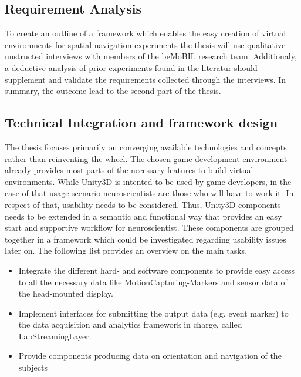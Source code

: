\documentclass[	DIV=calc, paper=a4,	fontsize=11pt, twocolumn]{scrartcl}
\newcommand{\cItemSpacing}{0.05em}
\begin{document}
\subsection*{Requirement Analysis}
To create an outline of a framework which enables the easy creation of virtual environments for spatial navigation experiments the thesis will use qualitative unstructed interviews with members of the beMoBIL research team. Additionaly, a deductive analysis of prior experiments found in the literatur should supplement and validate the requirements collected through the interviews. In summary, the outcome lead to the second part of the thesis.

\subsection*{Technical Integration and framework design} 
The thesis focuses primarily on converging available technologies and concepts rather than reinventing the wheel. The chosen game development environment already provides most parts of the necessary features to build virtual environments. While Unity3D is intented to be used by game developers, in the case of that usage scenario neuroscientists are those who will have to work it. In respect of that, usability needs to be considered. 
Thus, Unity3D components needs to be extended in a semantic and functional way that provides an easy start and supportive workflow for neuroscientist. These components are grouped together in a framework which could be investigated regarding usability issues later on. The following list provides an overview on the main tasks.

\begin{itemize}
\setlength\itemsep{\cItemSpacing}
\item Integrate the different hard- and software components to provide easy access to all the necessary data like MotionCapturing-Markers and sensor data of the head-mounted display.
\item Implement interfaces for submitting the output data (e.g. event marker) to the data acquisition and analytics framework in charge, called LabStreamingLayer.
\item Provide components producing data on orientation and navigation of the subjects
\end{itemize}
\end{document}
